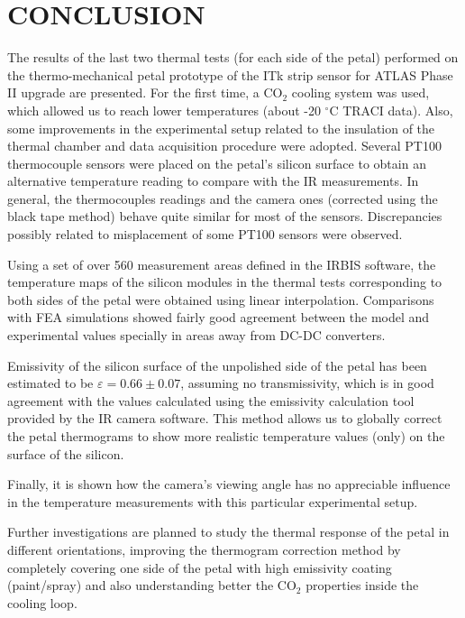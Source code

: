 \pagestyle{conclusions}

\section*{\uppercase{Conclusion}}\label{concl}
	\bigskip
	\bigskip
	The results of the last two thermal tests (for each side of the petal) performed on the thermo-mechanical petal prototype of the ITk strip sensor for ATLAS Phase II upgrade are presented. For the first time, a CO$_{2}$ cooling system was used, which allowed us to reach lower temperatures (about -20 $^{\circ}$C TRACI data). Also, some improvements in the experimental setup related to the insulation of the thermal chamber and data acquisition procedure were adopted. Several PT100 thermocouple sensors were placed on the petal’s silicon surface to obtain an alternative temperature reading to compare with the IR measurements. In general, the thermocouples readings and the camera ones (corrected using the black tape method) behave quite similar for most of the sensors. Discrepancies possibly related to misplacement of some PT100 sensors were observed.
	
	Using a set of over 560 measurement areas defined in the IRBIS software, the temperature maps of the silicon modules in the thermal tests corresponding to both sides of the petal were obtained using linear interpolation. Comparisons with FEA simulations showed fairly good agreement between the model and experimental values specially in areas away from DC-DC converters.
	
	Emissivity of the silicon surface of the unpolished side of the petal has been estimated to be $\varepsilon=0.66 \pm 0.07$, assuming no transmissivity, which is in good agreement with the values calculated using the emissivity calculation tool provided by the IR camera software. This method allows us to globally correct the petal thermograms to show more realistic temperature values (only) on the surface of the silicon. 
	
	Finally, it is shown how the camera’s viewing angle has no appreciable influence in the temperature measurements with this particular experimental setup.
	
	Further investigations are planned to study the thermal response of the petal in different orientations, improving the thermogram correction method by completely covering one side of the petal with high emissivity coating (paint/spray) and also understanding better the CO$_{2}$ properties inside the cooling loop.
	 
	